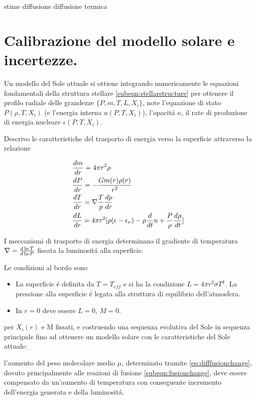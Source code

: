 \documentclass[../main.tex]{subfiles}
\begin{document}
\begingroup
\color{midnightblue}
stime diffusione
diffusione termica
\endgroup


\section{Calibrazione del modello solare e incertezze.}

Un modello del Sole attuale si ottiene integrando numericamente le equazioni fondamentali della struttura stellare \eqref{subeqn:stellarstructure} per ottenere il profilo radiale delle grandezze $\{P,m,T,L,X_i\}$, note  l'equazione di stato $P(\rho,T,X_i)$ (e l'energia interna $u(P,T,X_i)$), l'opacit\'a $\kappa$, il rate di produzione di energia nucleare $\epsilon(P,T,X_i)$.

Descrivo le caratteristiche del trasporto di energia verso la superficie attraverso la relazione

\begin{subequations}\label{subeqn:stellarstructure}
\begin{align}
&\TDy{r}{m}=4\pi r^2\rho\\
&\TDy{r}{P}=-\frac{Gm(r)\rho(r)}{r^2}\\
&\TDy{r}{T}=\nabla\frac{T}{p}\TDy{r}{p}\\
&\TDy{r}{L}=4\pi r^2[\rho(\epsilon-\epsilon_{\nu})-\rho\TDof{t}u+\frac{P}{\rho}\TDy{t}{\rho}]
\end{align}
\end{subequations}

I meccanismi di trasporto di energia determinano il gradiente di temperatura $\nabla=\TDly{P}{T}$ fissata la luminosit\'a alla superficie.

Le condizioni al bordo sono
\begin{itemize}
    \item La superficie \'e definita da $T=T_{eff}$ e si ha la condizione $L=4\pi r^2\sigma T^4$. La pressione alla superficie \'e legata alla struttura di equilibrio dell'atmosfera.
    \item In $r=0$ deve essere $L=0$, $M=0$.
\end{itemize}
per $X_i(r)$ e M fissati, e costruendo una sequenza evolutiva del Sole in sequenza principale fino ad ottenere un modello solare con le caratteristiche del Sole attuale:

l'aumento del peso molecolare medio $\mu$, determinato tramite \eqref{eq:difffusionchange}, dovuto principalmente alle reazioni di fusione \eqref{subeqn:fusionchange}, deve essere compensato da un'aumento di temperatura con conseguente incremento dell'energia generata e della luminosit\'a.
\end{document}
